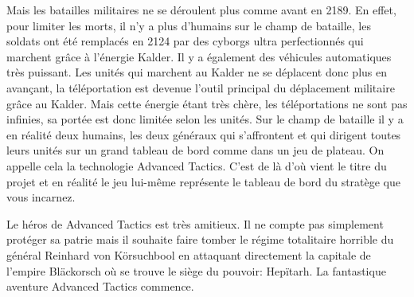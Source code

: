 \documentclass{article}
\begin{document}
\par
Mais les batailles militaires ne se déroulent plus comme avant en 2189. En effet, pour limiter les morts, il n'y a plus d'humains sur le champ de bataille, les soldats ont été remplacés en 2124 par des cyborgs ultra perfectionnés qui marchent grâce à l'énergie Kalder. Il y a également des véhicules automatiques très
puissant. Les unités qui marchent au Kalder ne se déplacent donc plus en avançant, la téléportation est devenue l'outil principal du déplacement militaire grâce au Kalder. Mais cette énergie étant très chère, les téléportations ne sont pas infinies, sa portée est donc limitée selon les unités. Sur le champ de bataille
il y a en réalité deux humains, les deux généraux qui s'affrontent et qui dirigent toutes leurs unités sur un grand tableau de bord comme dans un jeu de plateau. On appelle cela la technologie Advanced Tactics. C'est de là d'où vient le titre du projet et en réalité le jeu lui-même représente le tableau de bord du
stratège que vous incarnez.
\newline

\par
Le héros de Advanced Tactics est très amitieux. Il ne compte pas simplement protéger sa patrie mais il souhaite faire tomber le régime totalitaire horrible du général Reinhard von Körsuchbool en attaquant directement la capitale de l'empire Bläckorsch où se trouve le siège du pouvoir: Hepïtarh. La fantastique aventure
Advanced Tactics commence.
\newline

\newpage
\end{document}
